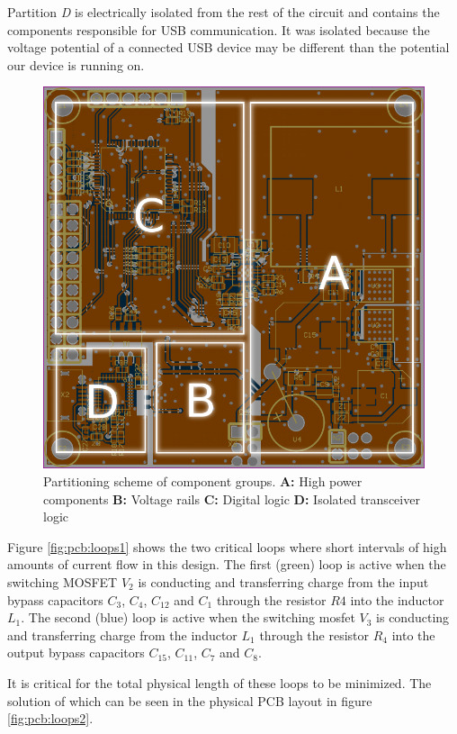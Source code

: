 Partition \emph{D} is  electrically  isolated  from  the rest of the circuit and
contains  the  components responsible for USB  communication.  It  was  isolated
because the  voltage  potential  of a connected USB device may be different than
the potential our device is running on.

\begin{figure}[th!]
    \centering
    \includegraphics[width=.45\linewidth]{images/pcb/partitioning.png}
    \caption{Partitioning scheme of component groups.
        \textbf{A:} High power components
        \textbf{B:} Voltage rails
        \textbf{C:} Digital logic
        \textbf{D:} Isolated transceiver logic
    }
    \label{fig:pcb:partitioning}
\end{figure}

Figure \ref{fig:pcb:loops1} shows the two critical loops  where  short intervals
of high amounts of current flow in this design. The first (green) loop is active
when the switching  MOSFET  $V_2$ is conducting and transferring charge from the
input bypass capacitors $C_3$, $C_4$, $C_{12}$ and  $C_1$  through  the resistor
$R4$  into  the  inductor  $L_1$.  The  second  (blue) loop is active  when  the
switching mosfet $V_3$ is conducting and transferring  charge  from the inductor
$L_1$ through the resistor $R_4$  into  the  output  bypass capacitors $C_{15}$,
$C_{11}$, $C_7$ and $C_8$.

It is critical for the total physical length of these loops to be minimized. The
solution  of  which  can  be  seen  in  the  physical   PCB   layout  in  figure
\ref{fig:pcb:loops2}.

